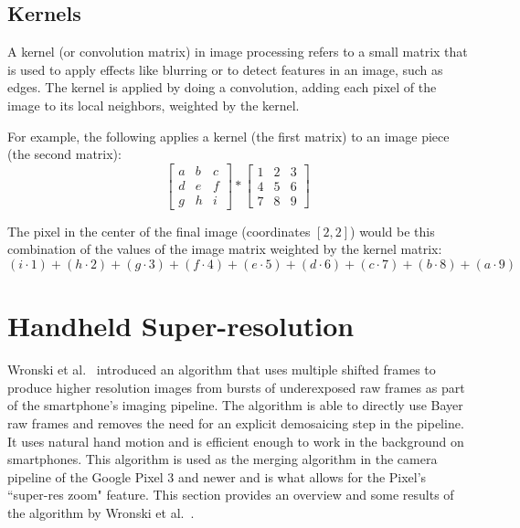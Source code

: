 \documentclass{sig-alternate}
\begin{document}
\subsection{Kernels}
\label{sec:background:kernels}

A kernel (or convolution matrix) in image processing refers to a small matrix that is used to apply effects like blurring or to detect features in an image, such as edges. The kernel is applied by doing a convolution, adding each pixel of the image to its local neighbors, weighted by the kernel. \cite{wiki:kernel}

For example, the following applies a kernel (the first matrix) to an image piece (the second matrix):
\begin{equation*}
\begin{bmatrix}
a & b & c \\
d & e & f \\
g & h & i
\end{bmatrix}
*
\begin{bmatrix}
1 & 2 & 3 \\
4 & 5 & 6 \\
7 & 8 & 9
\end{bmatrix}
\end{equation*}

The pixel in the center of the final image (coordinates $[2,2]$) would be this combination of the values of the image matrix weighted by the kernel matrix:
\begin{equation*}
(i \cdot 1)+(h \cdot 2)+(g \cdot 3)+(f \cdot 4)+(e \cdot 5)+(d \cdot 6)+(c \cdot 7)+(b \cdot 8)+(a \cdot 9)
\end{equation*}

\section{Handheld Super-resolution}
\label{sec:handheldSuperRes}

Wronski et al.~\cite{Wronski2019} introduced an algorithm that uses multiple shifted frames to produce higher resolution images from bursts of underexposed raw frames as part of the smartphone's imaging pipeline. The algorithm is able to directly use Bayer raw frames and removes the need for an explicit demosaicing step in the pipeline. It uses natural hand motion and is efficient enough to work in the background on smartphones. This algorithm is used as the merging algorithm in the camera pipeline of the Google Pixel 3 and newer and is what allows for the Pixel's ``super-res zoom" feature. This section provides an overview and some results of the algorithm by Wronski et al.~\cite{Wronski2019}.
\end{document}
